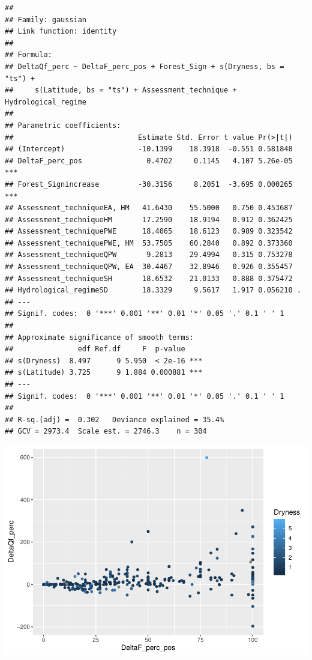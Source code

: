 \documentclass[]{elsarticle} %
\begin{document}
\begin{verbatim}
## 
## Family: gaussian 
## Link function: identity 
## 
## Formula:
## DeltaQf_perc ~ DeltaF_perc_pos + Forest_Sign + s(Dryness, bs = "ts") + 
##     s(Latitude, bs = "ts") + Assessment_technique + Hydrological_regime
## 
## Parametric coefficients:
##                             Estimate Std. Error t value Pr(>|t|)    
## (Intercept)                 -10.1399    18.3918  -0.551 0.581848    
## DeltaF_perc_pos               0.4702     0.1145   4.107 5.26e-05 ***
## Forest_Signincrease         -30.3156     8.2051  -3.695 0.000265 ***
## Assessment_techniqueEA, HM   41.6430    55.5000   0.750 0.453687    
## Assessment_techniqueHM       17.2590    18.9194   0.912 0.362425    
## Assessment_techniquePWE      18.4065    18.6123   0.989 0.323542    
## Assessment_techniquePWE, HM  53.7505    60.2840   0.892 0.373360    
## Assessment_techniqueQPW       9.2813    29.4994   0.315 0.753278    
## Assessment_techniqueQPW, EA  30.4467    32.8946   0.926 0.355457    
## Assessment_techniqueSH       18.6532    21.0133   0.888 0.375472    
## Hydrological_regimeSD        18.3329     9.5617   1.917 0.056210 .  
## ---
## Signif. codes:  0 '***' 0.001 '**' 0.01 '*' 0.05 '.' 0.1 ' ' 1
## 
## Approximate significance of smooth terms:
##               edf Ref.df     F  p-value    
## s(Dryness)  8.497      9 5.950  < 2e-16 ***
## s(Latitude) 3.725      9 1.884 0.000881 ***
## ---
## Signif. codes:  0 '***' 0.001 '**' 0.01 '*' 0.05 '.' 0.1 ' ' 1
## 
## R-sq.(adj) =  0.302   Deviance explained = 35.4%
## GCV = 2973.4  Scale est. = 2746.3    n = 304
\end{verbatim}

\includegraphics{Forest_and_Water_files/figure-latex/unnamed-chunk-17-1.pdf}
\end{document}
